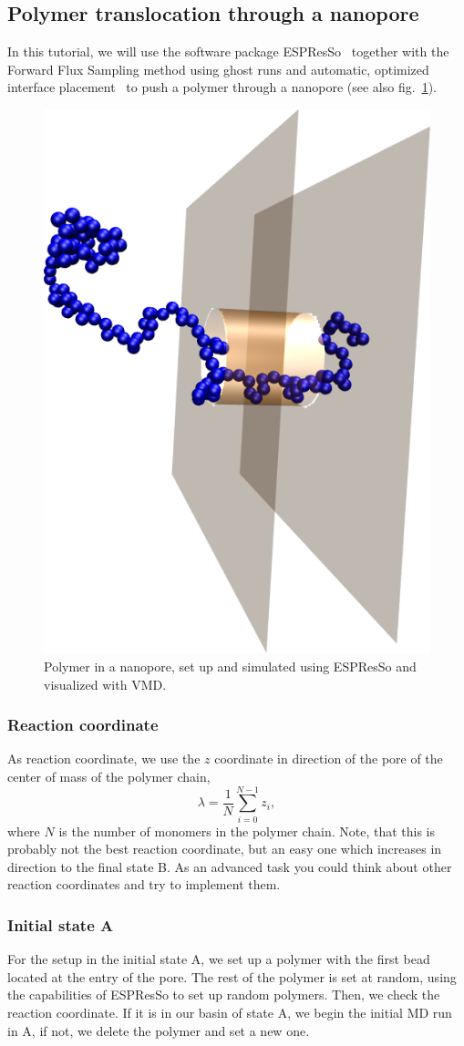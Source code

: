 \documentclass[a4paper,oneside]{article}
\begin{document}
\subsection{Polymer translocation through a nanopore}

In this tutorial, we will use the software package ESPResSo~\cite{espresso} together with the Forward Flux Sampling method using ghost runs and automatic, optimized interface placement~\cite{optiflux} to push a polymer through a nanopore (see also fig.~\ref{fig:nanopore}).
\begin{figure}[tb]
 \centering
 \includegraphics[width=0.3\linewidth]{pics/translocation2}
 \caption{Polymer in a nanopore, set up and simulated using ESPResSo and visualized with VMD.}
 \label{fig:nanopore}
\end{figure}

\subsubsection{Reaction coordinate}\label{sec:rc}
As reaction coordinate, we use the $z$ coordinate in direction of the pore of the center of mass of the polymer chain,
\begin{equation}
 \lambda=\frac{1}{N}\sum_{i=0}^{N-1}z_i,
\label{eq:rc}
\end{equation}
where $N$ is the number of monomers in the polymer chain. Note, that this is probably not the best reaction coordinate, but an easy one which increases in direction to the final state B. As an advanced task you could think about other reaction coordinates and try to implement them.

\subsubsection{Initial state A}\label{sec:initA}
For the setup in the initial state A, we set up a polymer with the first bead located at the entry of the pore. The rest of the polymer is set at random, using the capabilities of ESPResSo to set up random polymers. Then, we check the reaction coordinate. If it is in our basin of state A, we begin the initial MD run in A, if not, we delete the polymer and set a new one.
\end{document}
